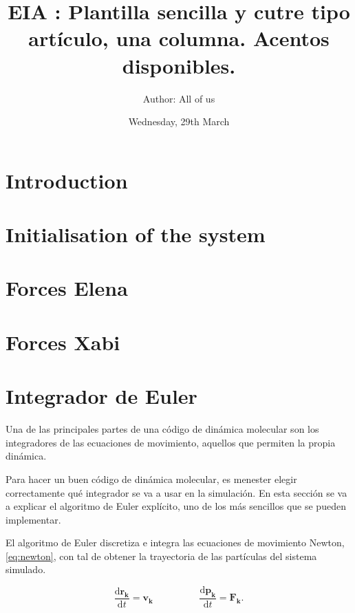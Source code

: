 \documentclass[onecolumn]{article}
\renewcommand{\vec}[1]{\mathbf{#1}}
\renewcommand{\d}{\text{d}}
\begin{document}
\pagestyle{fancy}


\title{EIA : Plantilla sencilla y cutre tipo artículo, una columna. Acentos disponibles.}
\author{Author: All of us}
\date{Wednesday, 29th March}

\maketitle

\section{Introduction}


\section{Initialisation of the system}


\section{Forces Elena}



\section{Forces Xabi}


\section{Integrador de Euler}

Una de las principales partes de una código de dinámica molecular son los integradores de las ecuaciones de movimiento,
aquellos que permiten la propia dinámica.

Para hacer un buen código de dinámica molecular, es menester elegir correctamente qué integrador se va a usar en la simulación.
En esta sección se va a explicar el algoritmo de Euler explícito, uno de los más sencillos que se pueden implementar.

El algoritmo de Euler discretiza e integra las ecuaciones de movimiento Newton, \eqref{eq:newton}, con tal de obtener la trayectoria de las partículas
del sistema simulado.

\begin{equation}\label{eq:newton}
\frac{\d\vec{r_k}}{\d t} = \vec{v_k}\hspace{2cm} \frac{\d\vec{p_k}}{\d t} = \vec{F_k} .
\end{equation}
\end{document}

